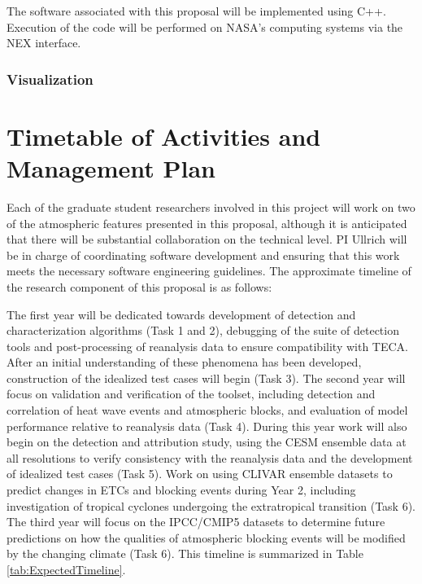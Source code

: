 \documentclass[11pt]{article}
\begin{document}
The software associated with this proposal will be implemented using C++.  Execution of the code will be performed on NASA's computing systems via the NEX interface.

\subsubsection{Visualization}



\section{Timetable of Activities and Management Plan} \label{sec:Timeline}

Each of the graduate student researchers involved in this project will work on two of the atmospheric features presented in this proposal, although it is anticipated that there will be substantial collaboration on the technical level.  PI Ullrich will be in charge of coordinating software development and ensuring that this work meets the necessary software engineering guidelines.  The approximate timeline of the research component of this proposal is as follows:

The first year will be dedicated towards development of detection and characterization algorithms (Task 1 and 2), debugging of the suite of detection tools and post-processing of reanalysis data to ensure compatibility with TECA.  After an initial understanding of these phenomena has been developed, construction of the idealized test cases will begin (Task 3).  The second year will focus on validation and verification of the toolset, including detection and correlation of heat wave events and atmospheric blocks, and evaluation of model performance relative to reanalysis data (Task 4).  During this year work will also begin on the detection and attribution study, using the CESM ensemble data at all resolutions to verify consistency with the reanalysis data and the development of idealized test cases (Task 5).  Work on using CLIVAR ensemble datasets to predict changes in ETCs and blocking events during Year 2, including investigation of tropical cyclones undergoing the extratropical transition (Task 6).  The third year will focus on the IPCC/CMIP5 datasets to determine future predictions on how the qualities of atmospheric blocking events will be modified by the changing climate (Task  6).  This timeline is summarized in Table \ref{tab:ExpectedTimeline}.
\end{document}
